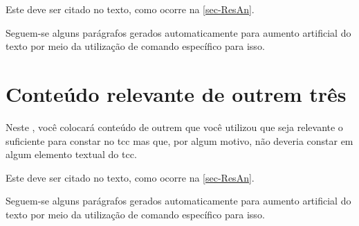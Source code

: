 \begin{anexosenv}
Este  deve ser citado no texto, como ocorre na \autoref{sec-ResAn}.

Seguem-se alguns parágrafos gerados automaticamente para aumento artificial do texto por meio da utilização de comando específico para isso.

\lipsum[23-25]

\chapter{Conteúdo relevante de outrem três} %
\label{ane-três}

Neste , você colocará conteúdo de outrem que você utilizou que seja relevante o suficiente para constar no \ac{tcc} mas que, por algum motivo, não deveria constar em algum elemento textual do \ac{tcc}.

Este  deve ser citado no texto, como ocorre na \autoref{sec-ResAn}.

Seguem-se alguns parágrafos gerados automaticamente para aumento artificial do texto por meio da utilização de comando específico para isso.

\lipsum[23-25]

\end{anexosenv}